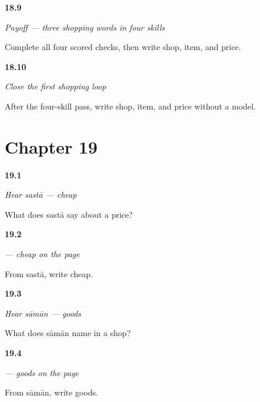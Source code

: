 \noindent\begin{minipage}[t]{\linewidth}
\raggedright
\hypertarget{review-MW-C13-shopping-three-payoff}{\textbf{18.9}} \emph{Payoff — three shopping words in four skills}\par
\small Complete all four scored checks, then write shop, item, and price.
\end{minipage}\par\medskip

\noindent\begin{minipage}[t]{\linewidth}
\raggedright
\hypertarget{review-MW-R13-shopping-close-recall}{\textbf{18.10}} \emph{Close the first shopping loop}\par
\small After the four-skill pass, write shop, item, and price without a model.
\end{minipage}\par\medskip

\section*{Chapter 19}

\noindent\begin{minipage}[t]{\linewidth}
\raggedright
\hypertarget{review-MW-C14-hear-sasta-meaning}{\textbf{19.1}} \emph{Hear \emph{sastā} — cheap}\par
\small What does sastā say about a price?
\end{minipage}\par\medskip

\noindent\begin{minipage}[t]{\linewidth}
\raggedright
\hypertarget{review-MW-C14-sasta-dictation}{\textbf{19.2}} \emph{ — cheap on the page}\par
\small From sastā, write cheap.
\end{minipage}\par\medskip

\noindent\begin{minipage}[t]{\linewidth}
\raggedright
\hypertarget{review-MW-C14-hear-samaan-meaning}{\textbf{19.3}} \emph{Hear \emph{sāmān} — goods}\par
\small What does sāmān name in a shop?
\end{minipage}\par\medskip

\noindent\begin{minipage}[t]{\linewidth}
\raggedright
\hypertarget{review-MW-C14-samaan-dictation}{\textbf{19.4}} \emph{ — goods on the page}\par
\small From sāmān, write goods.
\end{minipage}\par\medskip

